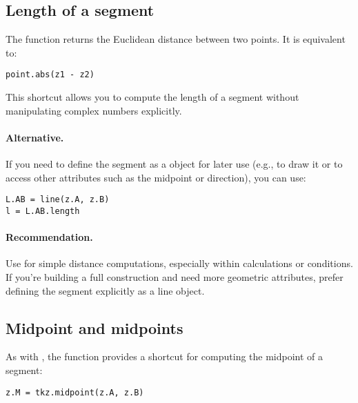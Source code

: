 \subsection{Length of a segment}
\label{sub:length_of_a_segment}

The function  returns the Euclidean distance between two points. It is equivalent to:

\begin{mybox}
\begin{verbatim}
point.abs(z1 - z2)
\end{verbatim}
\end{mybox}

This shortcut allows you to compute the length of a segment without manipulating complex numbers explicitly.

\paragraph{Alternative.}
If you need to define the segment as a  object for later use (e.g., to draw it or to access other attributes such as the midpoint or direction), you can use:

\begin{mybox}
\begin{verbatim}
L.AB = line(z.A, z.B)
l = L.AB.length
\end{verbatim}
\end{mybox}

\paragraph{Recommendation.}
Use  for simple distance computations, especially within calculations or conditions. If you're building a full construction and need more geometric attributes, prefer defining the segment explicitly as a line object.

\subsection{Midpoint and midpoints}
\label{sub:midpoint_and_midpoints}

As with , the function  provides a shortcut for computing the midpoint of a segment:

\begin{mybox}
\begin{verbatim}
z.M = tkz.midpoint(z.A, z.B)
\end{verbatim}
\end{mybox}

